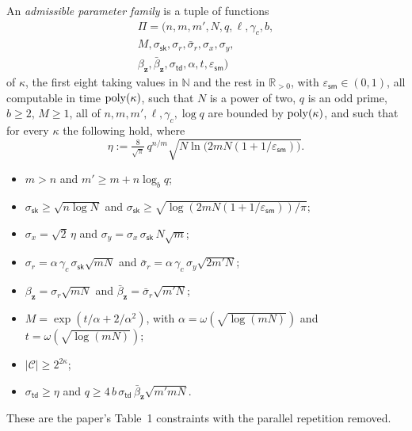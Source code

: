 \documentclass{aicr-conjecture}
\newcommand{\RR}{\mathbb{R}}
\newcommand{\NN}{\mathbb{N}}
\newcommand{\cC}{\mathcal{C}}
\newcommand{\ssk}{\sigma_{\mathsf{sk}}}
\newcommand{\std}{\sigma_{\mathsf{td}}}
\newcommand{\esm}{\varepsilon_{\mathsf{sm}}}
\begin{document}
\begin{definition}
\label{def:params}
An \emph{admissible parameter family} is a tuple of functions
\begin{multline*}
  \Pi = (n,m,m',N,q,\ell,\gamma_c,b,\\
  M,\ssk,\sigma_r,\bar\sigma_r,\sigma_x,\sigma_y,\\
  \beta_{\mathbf{z}},\bar\beta_{\mathbf{z}},\std,\alpha,t,\esm)
\end{multline*}
of $\kappa$, the first eight taking values in $\NN$ and the rest in
$\RR_{>0}$, with $\esm \in (0,1)$, all computable in time
$\mathrm{poly}(\kappa)$, such that $N$ is a power of two, $q$ is an odd prime,
$b \ge 2$, $M \ge 1$, all of $n,m,m',\ell,\gamma_c,\log q$ are bounded
by $\mathrm{poly}(\kappa)$, and such that for every $\kappa$ the following hold,
where
\[
  \eta := \tfrac{8}{\sqrt{\pi}}\, q^{n/m}
    \sqrt{N \ln\bigl(2mN(1+1/\esm)\bigr)}.
\]
\begin{itemize}[leftmargin=1.2em]
  \item $m > n$ and $m' \ge m + n\log_b q$;
  \item $\ssk \ge \sqrt{n \log N}$ and
  $\ssk \ge \sqrt{\log(2mN(1+1/\esm))/\pi}$;
  \item $\sigma_x = \sqrt{2}\,\eta$ and
  $\sigma_y = \sigma_x\,\ssk\,N\sqrt{m}$;
  \item $\sigma_r = \alpha\,\gamma_c\,\ssk\sqrt{mN}$ and
  $\bar\sigma_r = \alpha\,\gamma_c\,\sigma_y\sqrt{2m'N}$;
  \item $\beta_{\mathbf{z}} = \sigma_r\sqrt{mN}$ and
  $\bar\beta_{\mathbf{z}} = \bar\sigma_r\sqrt{m'N}$;
  \item $M = \exp(t/\alpha + 2/\alpha^2)$, with
  $\alpha = \omega(\sqrt{\log(mN)})$ and
  $t = \omega(\sqrt{\log(mN)})$;
  \item $|\cC| \ge 2^{2\kappa}$;
  \item $\std \ge \eta$ and
  $q \ge 4\,b\,\std\,\bar\beta_{\mathbf{z}}\sqrt{m'mN}$.
\end{itemize}
These are the paper's Table~1 constraints with the parallel repetition
removed.
\end{definition}
\end{document}
